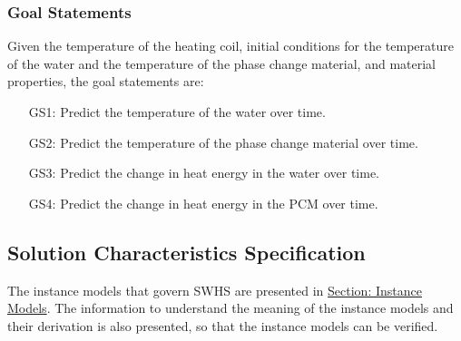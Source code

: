 \documentclass[12pt]{article}
\begin{document}
\subsubsection{Goal Statements}
\label{Sec:GoalStmt}
Given the temperature of the heating coil, initial conditions for the temperature of the water and the temperature of the phase change material, and material properties, the goal statements are:
\begin{itemize}
\item[GS1:]Predict the temperature of the water over time.
\item[GS2:]Predict the temperature of the phase change material over time.
\item[GS3:]Predict the change in heat energy in the water over time.
\item[GS4:]Predict the change in heat energy in the PCM over time.
\end{itemize}
\subsection{Solution Characteristics Specification}
\label{Sec:SolCharSpec}
The instance models that govern SWHS are presented in \hyperref[Sec:IMs]{Section: Instance Models}. The information to understand the meaning of the instance models and their derivation is also presented, so that the instance models can be verified.
\end{document}
